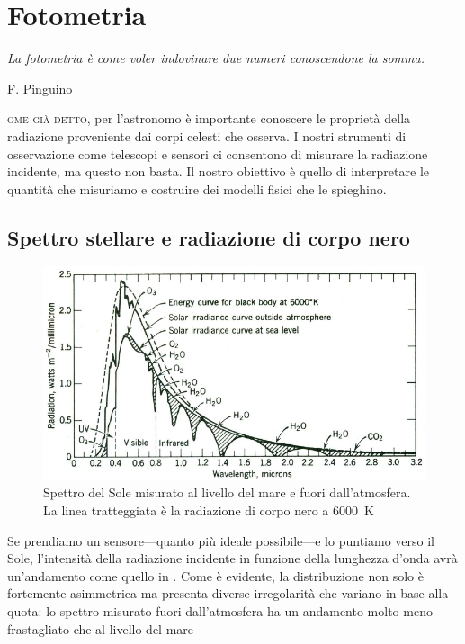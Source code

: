 \chapter{Fotometria}\label{ch:fotometria}
\epigraph{\itshape La fotometria è come voler indovinare due numeri conoscendone la somma.}{F. Pinguino}
\noindent{}\textsc{ome già detto}, per l'astronomo è importante conoscere le proprietà della radiazione proveniente dai corpi celesti che osserva. I nostri strumenti di osservazione come telescopi e sensori ci consentono di misurare la radiazione incidente, ma questo non basta. Il nostro obiettivo è quello di interpretare le quantità che misuriamo e costruire dei modelli fisici che le spieghino.
\section{Spettro stellare e radiazione di corpo nero}
    \begin{figure}
        \centering
        \includegraphics[width=\imagebig]{images/fotometria/solar-spectrum-2.png}
        \caption{Spettro del Sole misurato al livello del mare e fuori dall'atmosfera. La linea tratteggiata è la radiazione di corpo nero a \SI{6000}{\kelvin}}
        \label{fig:solar-spectrum-1}
    \end{figure}
    Se prendiamo un sensore---quanto più ideale possibile---e lo puntiamo verso il Sole, l'intensità della radiazione incidente in funzione della lunghezza d'onda avrà un'andamento come quello in . Come è evidente, la distribuzione non solo è fortemente asimmetrica ma presenta diverse irregolarità che variano in base alla quota: lo spettro misurato fuori dall'atmosfera ha un andamento molto meno frastagliato che al livello del mare
    
